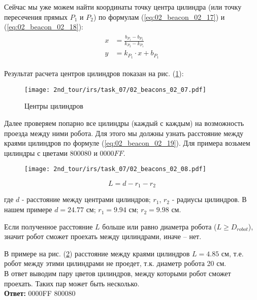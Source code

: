 Сейчас мы уже можем найти координаты точку центра цилиндра (или точку пересечения прямых $P_1$ и $P_2$) по формулам (\ref{eq:02_beacon_02_17}) и (\ref{eq:02_beacon_02_18}):
\begin{eqnarray}
\begin{aligned}
x &= \frac{b_{P_1} - b_{P_2}}{k_{P_2} - k_{P_1}}
\label{eq:02_beacon_02_17}\\
y &= k_{P_1} \cdot x + b_{P_1}
\label{eq:02_beacon_02_18}
\end{aligned}
\end{eqnarray}

Результат расчета центров цилиндров показан на рис. (\ref{fig:02_beacons_02_07}):
\begin{figure}[h!]
	\centering
	\texttt{[image: 2nd\_tour/irs/task\_07/02\_beacons\_02\_07.pdf]}
	\caption{Центры цилиндров}
	\label{fig:02_beacons_02_07}
\end{figure}

Далее проверяем попарно все цилиндры (каждый с каждым) на возможность проезда между ними робота. Для этого мы должны узнать расстояние между краями цилиндров по формуле (\ref{eq:02_beacon_02_19}). Для примера возьмем цилиндры с цветами $800080$ и $0000FF$.

\begin{figure}[h!]
	\centering
	\texttt{[image: 2nd\_tour/irs/task\_07/02\_beacons\_02\_08.pdf]}
	\caption{}
	\label{fig:02_beacons_02_08}
\end{figure}

\begin{equation}
L = d - r_1 - r_2
\label{eq:02_beacon_02_19}
\end{equation}

где $d$ - расстояние между центрами цилиндров; $r_1$, $r_2$ - радиусы цилиндров. 
В нашем примере $d = 24.77 \text{ см}$; $r_1=9.94 \text{ см}$; $r_2=9.98 \text{ см}$.

Если полученное расстояние $L$ больше или равно диаметра робота ($L \geq D_{robot}$), значит робот сможет проехать между цилиндрами, иначе – нет.

В примере на рис. (\ref{fig:02_beacons_02_08}) расстояние между краями цилиндров $L=4.85$ см, т.е. робот между этими цилиндрами не проедет, т.к. диаметр робота 20 см.
\\

В ответ выводим пару цветов цилиндров, между которыми робот сможет проехать. Таких пар может быть несколько.
\\

\textbf{Ответ: } 0000FF 800080


\codeExample

